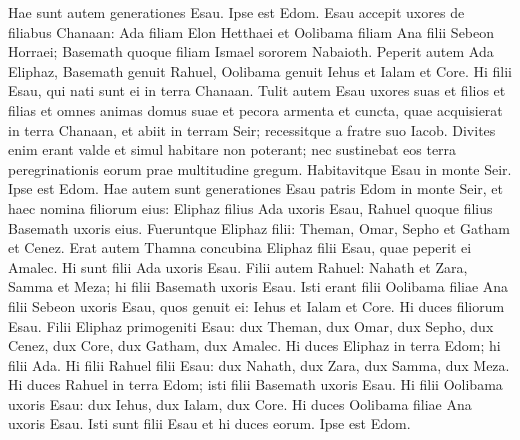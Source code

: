 \begin{biblechapter}
\begin{biblechapter}
\begin{biblechapter}
\begin{biblechapter}
\begin{biblechapter}
\begin{biblechapter}
\begin{biblechapter}
\begin{biblechapter}
\begin{biblechapter}
\begin{biblechapter}
\begin{biblechapter}
\begin{biblechapter}
\begin{biblechapter}
\begin{biblechapter}
\begin{biblechapter}
\begin{biblechapter}
\begin{biblechapter}
\begin{biblechapter}
\begin{biblechapter}
\begin{biblechapter}
\begin{biblechapter}
\begin{biblechapter}
\begin{biblechapter}
\begin{biblechapter}
\begin{biblechapter}
\begin{biblechapter}
\begin{biblechapter}
\begin{biblechapter}
\begin{biblechapter}
\begin{biblechapter}
\begin{biblechapter}
\begin{biblechapter}
\begin{biblechapter}
\begin{biblechapter}
\begin{biblechapter}
\begin{biblechapter}
\verse Hae sunt autem generationes Esau. Ipse est Edom.
 \verse Esau accepit uxores de filiabus Chanaan: Ada filiam Elon Hetthaei et Oolibama filiam Ana filii Sebeon Horraei; 
\verse Basemath quoque filiam Ismael sororem Nabaioth. 
\verse Peperit autem Ada Eliphaz, Basemath genuit Rahuel, 
\verse Oolibama genuit Iehus et Ialam et Core.
 Hi filii Esau, qui nati sunt ei in terra Chanaan.
 \verse Tulit autem Esau uxores suas et filios et filias et omnes animas domus suae et pecora armenta et cuncta, quae acquisierat in terra Chanaan, et abiit in terram Seir; recessitque a fratre suo Iacob. 
\verse Divites enim erant valde et simul habitare non poterant; nec sustinebat eos terra peregrinationis eorum prae multitudine gregum.
 \verse Habitavitque Esau in monte Seir. Ipse est Edom.
 \verse Hae autem sunt generationes Esau patris Edom in monte Seir, 
\verse et haec nomina filiorum eius: Eliphaz filius Ada uxoris Esau, Rahuel quoque filius Basemath uxoris eius.
 \verse Fueruntque Eliphaz filii: Theman, Omar, Sepho et Gatham et Cenez. 
\verse Erat autem Thamna concubina Eliphaz filii Esau, quae peperit ei Amalec. Hi sunt filii Ada uxoris Esau.
 \verse Filii autem Rahuel: Nahath et Zara, Samma et Meza; hi filii Basemath uxoris Esau.
 \verse Isti erant filii Oolibama filiae Ana filii Sebeon uxoris Esau, quos genuit ei: Iehus et Ialam et Core.
 \verse Hi duces filiorum Esau. Filii Eliphaz primogeniti Esau: dux Theman, dux Omar, dux Sepho, dux Cenez, 
\verse dux Core, dux Gatham, dux Amalec. Hi duces Eliphaz in terra Edom; hi filii Ada.
 \verse Hi filii Rahuel filii Esau: dux Nahath, dux Zara, dux Samma, dux Meza. Hi duces Rahuel in terra Edom; isti filii Basemath uxoris Esau.
 \verse Hi filii Oolibama uxoris Esau: dux Iehus, dux Ialam, dux Core. Hi duces Oolibama filiae Ana uxoris Esau.
 \verse Isti sunt filii Esau et hi duces eorum. Ipse est Edom.

\end{biblechapter}
\end{biblechapter}
\end{biblechapter}
\end{biblechapter}
\end{biblechapter}
\end{biblechapter}
\end{biblechapter}
\end{biblechapter}
\end{biblechapter}
\end{biblechapter}
\end{biblechapter}
\end{biblechapter}
\end{biblechapter}
\end{biblechapter}
\end{biblechapter}
\end{biblechapter}
\end{biblechapter}
\end{biblechapter}
\end{biblechapter}
\end{biblechapter}
\end{biblechapter}
\end{biblechapter}
\end{biblechapter}
\end{biblechapter}
\end{biblechapter}
\end{biblechapter}
\end{biblechapter}
\end{biblechapter}
\end{biblechapter}
\end{biblechapter}
\end{biblechapter}
\end{biblechapter}
\end{biblechapter}
\end{biblechapter}
\end{biblechapter}
\end{biblechapter}
